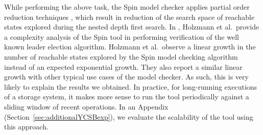 \documentclass[conference]{IEEEtran}
\begin{document}
	While performing the above task, the Spin model checker  applies partial order reduction techniques \cite{Peled1994}, which result in reduction of the search space of reachable states explored during the nested depth first search. In  \cite{Holzmann:1997:MCS:260897.260902}, Holzmann et al.\ provide a complexity analysis of the Spin tool in performing verification of the well known leader election algorithm. Holzmann et al.\ observe a linear growth in the number of reachable states explored by the Spin model checking algorithm instead of an expected exponential growth. They also report a similar linear growth with other typical use cases of the model checker. As such, this is very likely to explain the results we obtained.  
	In practice, for long-running executions of a storage system, it makes more sense to run the tool periodically against a sliding window of recent operations. In an Appendix (Section~\ref{sec:additionalYCSBexp}), we evaluate the scalability of the tool using this approach.
	
	
	
\end{document}
